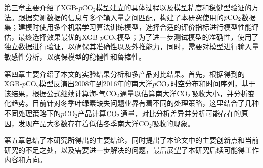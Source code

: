 第三章主要介绍了XGB-$p\mathrm{CO_2}$模型建立的具体过程以及模型精度和稳健型验证的方法。跟据实测数据的信息与多个输入量之间匹配，构建了本研究使用的$p\rm CO_2$数据集；建模时使用多个机器学习算法训练模型，选择合适的评价指标进行模型性能评估，最终选择效果最优的XGB-$p\mathrm{CO_2}$模型；为了进一步测试模型的准确性，使用了独立数据进行验证，以确保其准确性以及外推能力，同时，需要对模型进行输入量敏感性分析，以确保模型的稳健性和鲁棒性。

第四章主要介绍了本文的实验结果分析和多产品对比结果。首先，根据得到的XGB-$p\mathrm{CO_2}$模型反演出2008年到2016年的南大洋$p\rm CO_2$时空分布和时间序列，基于该结果，根据公式继续计算海-气$\rm CO_2$通量以估算南大洋$\rm CO_2$吸收大小，并分析变化趋势。目前针对冬季叶绿素缺失问题业界有着不同的处理策略，这里结合了几种不同处理策略下的$p\mathrm{CO_2}$产品计算$\rm CO_2$通量，对比分析差异并分析可能存在的原因，发现产品大多数存在着低估冬季南大洋$\mathrm{CO_2}$吸收的现象。

第五章总结了本研究所得出的主要结论，同时提出了本论文中的主要创新点和当前研究的不足之处，以及需要进一步解决的问题，最后展望了本研究后续可能得工作内容和方向。